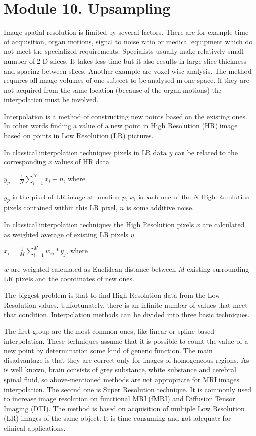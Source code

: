 \section{Module 10. Upsampling}

Image spatial resolution is limited by several factors. There are for example time of acquisition, organ motions, signal to noise ratio or medical equipment which do not meet the specialized requirements. Specialists usually make relatively small number of 2-D slices. It takes less time but it also results in large slice thickness and spacing between slices. Another example are voxel-wise analysis. The method requires all image volumes of one subject to be analysed in one space. If they are not acquired from the same location (because of the organ motions) the interpolation must be involved.

Interpolation is a method of constructing new points based on the
existing ones. In other words finding a value of a new point in High
Resolution (HR) image based on points in Low Resolution (LR) pictures.

In classical interpolation techniques pixels in LR data $y$ can be
related to the corresponding $x$ values of HR data:
\centerline {$y_{p}=\frac{1}{N}\sum_{i=1}^{N}x_{i}+n$, where }
\newline $y_{p}$ is the pixel of LR image at location $p$, \newline $x_{i}$ is each one of the $N$ High Resolution pixels contained within this
LR pixel,
\newline $n$ is some additive noise.

In classical interpolation techniques the High Resolution pixels $x$ are calculated as weighted average of existing LR pixels $y$.
\newline \centerline{$x_{i}=\frac{1}{M}\sum_{i=1}^{M}w_{ij}*y_{j}$, where}
\newline $w$ are weighted calculated as Euclidean distance between $M$ existing surrounding LR pixels and the coordinates of new ones.   

The biggest problem is that to find High Resolution data from the
Low Resolution values. Unfortunately, there is an infinite number
of values that meet that condition. Interpolation methods can be divided
into three basic techniques.

The first group are the most common ones, like linear or spline-based
interpolation. These techniques assume that it is possible to count
the value of a new point by determination some kind of generic function.
The main disadvantage is that they are correct only for images of
homogeneous regions. As is well known, brain consists of grey substance,
white substance and cerebral spinal fluid, so above-mentioned methods
are not appropriate for MRI images interpolation. The second one is
Super Resolution technique. It is commonly used to increase image
resolution on functional MRI (fMRI) and Diffusion Tensor Imaging (DTI).
The method is based on acquisition of multiple Low Resolution (LR)
images of the same object. It is time consuming and not adequate for
clinical applications.

